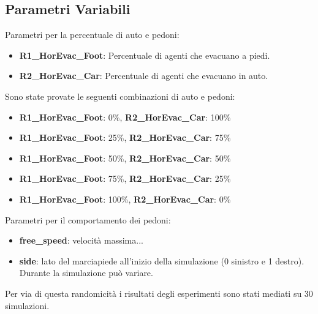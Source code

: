 \subsection{Parametri Variabili}

Parametri per la percentuale di auto e pedoni:
\begin{itemize}
  \item \textbf{R1\_HorEvac\_Foot}: Percentuale di agenti che evacuano a piedi.
  \item \textbf{R2\_HorEvac\_Car}: Percentuale di agenti che evacuano in auto.
\end{itemize}

\noindent
Sono state provate le seguenti combinazioni di auto e pedoni:
\begin{itemize}
  \item \textbf{R1\_HorEvac\_Foot}: 0\%, \textbf{R2\_HorEvac\_Car}: 100\%
  \item \textbf{R1\_HorEvac\_Foot}: 25\%, \textbf{R2\_HorEvac\_Car}: 75\%
  \item \textbf{R1\_HorEvac\_Foot}: 50\%, \textbf{R2\_HorEvac\_Car}: 50\%
  \item \textbf{R1\_HorEvac\_Foot}: 75\%, \textbf{R2\_HorEvac\_Car}: 25\%
  \item \textbf{R1\_HorEvac\_Foot}: 100\%, \textbf{R2\_HorEvac\_Car}: 0\%
\end{itemize}

\noindent
Parametri per il comportamento dei pedoni:
\begin{itemize}
  \item \textbf{free\_speed}: velocità massima... %
  \item \textbf{side}: lato del marciapiede all'inizio della simulazione (0 sinistro e 1 destro). Durante la simulazione può variare. 
\end{itemize}

\noindent
Per via di questa randomicità i risultati degli esperimenti sono stati mediati su 30 simulazioni.
